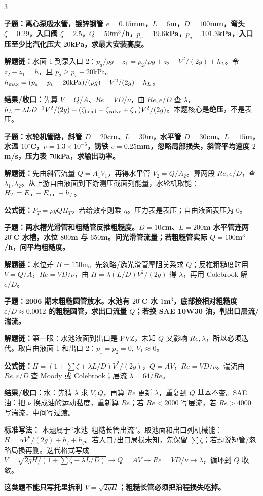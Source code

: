 \documentclass[a4paper]{article}
\newcommand{\qt}[1]{\vspace{0.10pt}\colorbox{Q}{\parbox{\dimexpr\linewidth-2\fboxsep}{\color{white}\bfseries #1}}\par}
\newcommand{\ans}[1]{\colorbox{G}{\parbox{\dimexpr\linewidth-2\fboxsep}{#1}}\par}
\newcommand{\warn}[1]{\colorbox{Y}{\parbox{\dimexpr\linewidth-2\fboxsep}{\color{E}\bfseries #1}}\par}
\newcommand{\chain}[1]{{\color{A}\bfseries 解题链：}#1\par}
\newcommand{\res}[1]{{\color{E}\bfseries 结果/收口：}#1\par}
\newcommand{\form}[1]{{\color{M}\bfseries 公式链：}#1\par}
\begin{document}
\begin{multicols}{3}
\qt{子题：离心泵吸水管，镀锌钢管 $e=0.15$mm，$L=6$m，$D=100$mm，弯头 $\zeta=0.29$，入口阀 $\zeta=2.5$，$Q=50$m$^3$/h，$p_v=19.6$kPa，$p_a=101.3$kPa，入口压至少比汽化压大 $20$kPa，求最大安装高度。}
\chain{水面 1 到泵入口 2：$p_a/\rho g+z_1=p_2/\rho g+z_2+V^2/(2g)+h_L$。令 $z_2-z_1=h$，且 $p_2\ge p_v+20$kPa。$h_{\max}=(p_a-p_v-20{\rm kPa})/(\rho g)-V^2/(2g)-h_L$。}
\res{先算 $V=Q/A$、$Re=VD/\nu$，由 $Re,e/D$ 查 $\lambda$，$h_L=\lambda LD^{-1}V^2/(2g)+(\zeta_{\rm bend}+\zeta_{\rm valve}+\zeta_{\rm in}) V^2/(2g)$。本题核心是\textbf{绝压}，不是表压。}

\qt{子题：水轮机管路，斜管 $D=20$cm、$L=30$m，水平管 $D=30$cm、$L=15$m，水温 $10^\circ$C，$\nu=1.3\times10^{-6}$，铸铁 $e=0.25$mm，忽略局部损失，斜管平均速度 $2$m/s，压力表 $70$kPa，求输出功率。}
\chain{先由斜管流量 $Q=A_1V_1$，再得水平管 $V_2=Q/A_2$。算两段 $Re,e/D$，查 $\lambda_1,\lambda_2$。从上游自由液面到下游测压截面列能量，水轮机取能：$H_T=E_{\rm in}-E_{\rm out}-h_f$。}
\form{$P_T=\rho gQH_T$，若给效率则乘 $\eta$。压力表是表压；自由液面表压为 0。}

\qt{子题：两水槽光滑管和粗糙管反推粗糙度。$D=10$cm、$L=200$m 水平管连两 $20^\circ$C 水槽，水位 $800$m 与 $650$m。问光滑管流量；若粗糙管实际 $Q=100$m$^3$/h，问平均粗糙度。}
\chain{水位差 $H=150$m。先忽略/选光滑管摩阻关系求 $Q$；反推粗糙度时用 $V=Q/A$，$Re=VD/\nu$，由 $H=\lambda(L/D)V^2/(2g)$ 得 $\lambda$，再用 Colebrook 解 $e/D$。}

\qt{子题：2006 期末粗糙圆管放水。水池有 $20^\circ$C 水 $1$m$^3$，底部接相对粗糙度 $\varepsilon/D\approx0.0012$ 的粗糙圆管，求出口流量 $Q$；若换 SAE 10W30 油，判出口层流/湍流。}
\chain{第一眼：水池液面到出口是 PVZ，未知 $Q$ 又影响 $Re,\lambda$，所以必须迭代。取自由液面 1 和出口 2：$p_1=p_2=0,\ V_1\approx0$。}
\form{$H=\left(1+\sum\zeta+\lambda L/D\right)V^2/(2g)$，$Q=AV$，$Re=VD/\nu$。湍流由 $Re,\varepsilon/D$ 查 Moody 或 Colebrook；层流 $\lambda=64/Re$。}
\res{水：先猜 $\lambda$ 求 $V,Q$，再算 $Re$ 更新 $\lambda$，重复到 $Q$ 基本不变。SAE 油：把 $\nu$ 换成油的运动黏度，重新算 $Re$；若 $Re<2000$ 写层流，若 $Re>4000$ 写湍流，中间写过渡。}
\ans{\textbf{标准写法：} 本题属于“水池--粗糙长管出流”。取池面和出口列机械能：$H=\alpha V^2/(2g)+h_f+h_\zeta$。若入口/出口局损未知，先保留 $\sum\zeta$；若题说短管/忽略局损再删。迭代格式写成 $V=\sqrt{2gH/(1+\sum\zeta+\lambda L/D)}\to Q=AV\to Re=VD/\nu\to\lambda$，循环到 $Q$ 收敛。}
\warn{这类题不能只写托里拆利 $V=\sqrt{2gH}$；粗糙长管必须把沿程损失吃掉。}


\end{multicols}
\end{document}
